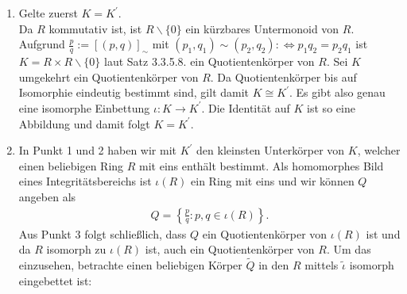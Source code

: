 \begin{solution}
\begin{enumerate}
  \item Gelte zuerst $K = K^{\prime}$. \\
  Da $R$ kommutativ ist, ist $R\backslash\{0\}$ ein kürzbares Untermonoid von $R$.
  Aufgrund $\frac{p}{q} := [(p,q)]_{\sim}$ mit $(p_1,q_1) \sim (p_2,q_2) :\iff p_1q_2 = p_2q_1$
  ist $K = R \times R\backslash\{0\}$ laut Satz 3.3.5.8. ein Quotientenkörper von $R$.
  Sei $K$ umgekehrt ein Quotientenkörper von $R$. Da Quotientenkörper bis auf
  Isomorphie eindeutig bestimmt sind, gilt damit  $K \cong K^{\prime}$. Es gibt also
  genau eine isomorphe Einbettung $\iota: K \rightarrow K^{\prime}$. Die Identität
  auf $K$ ist so eine Abbildung und damit folgt $K = K^{\prime}$.
  \item In Punkt 1 und 2 haben wir mit $K^{\prime}$ den kleinsten Unterkörper von $K$,
  welcher einen beliebigen Ring $R$ mit eins enthält bestimmt. Als homomorphes Bild eines
  Integritätsbereichs ist $\iota(R)$ ein Ring mit eins und wir können $Q$ angeben als
  \begin{align*}
    Q = \left\{ \frac{p}{q}: p,q \in \iota(R)\right\}.
  \end{align*}
  Aus Punkt 3 folgt schließlich, dass $Q$ ein Quotientenkörper von $\iota(R)$ ist
  und da $R$ isomorph zu $\iota(R)$ ist, auch ein Quotientenkörper von $R$.
  Um das einzusehen, betrachte einen beliebigen Körper $\widetilde{Q}$ in den $R$
  mittels $\widetilde{\iota}$ isomorph eingebettet ist:
  \begin{center}
   \\
  \end{center}
\end{enumerate}

\end{solution}
